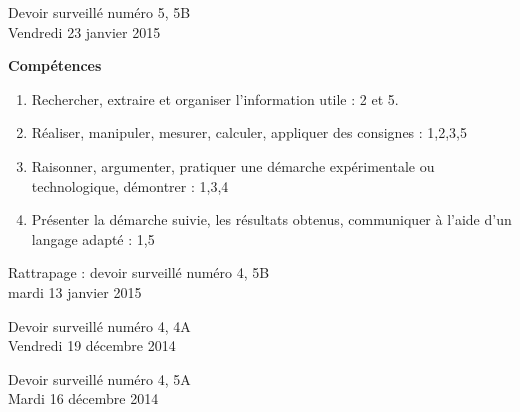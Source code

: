 \documentclass[a4paper,10pt]{article}
\begin{document}
\begin{feuilleDS}{Devoir surveillé numéro 5, 5B\\ \small Vendredi 23 janvier 2015}

\vspace{1cm}
{\bf Compétences}
\begin{enumerate}
    \item
        Rechercher, extraire et organiser l'information utile : 2 et 5.
    \item
Réaliser, manipuler, mesurer, calculer, appliquer des consignes : 1,2,3,5
\item
Raisonner, argumenter, pratiquer une démarche expérimentale ou technologique, démontrer : 1,3,4
\item 
Présenter la démarche suivie, les résultats obtenus, communiquer à l'aide d’un langage adapté : 1,5
\end{enumerate}

\end{feuilleDS}




\begin{feuilleDS}{Rattrapage : devoir surveillé numéro 4, 5B\\ \small mardi 13 janvier 2015}
\end{feuilleDS}


\begin{feuilleDS}{Devoir surveillé numéro 4, 4A\\ \small Vendredi 19 décembre 2014}

\end{feuilleDS}


\begin{feuilleDS}{Devoir surveillé numéro 4, 5A\\ \small Mardi 16 décembre 2014}
\end{feuilleDS}
\end{document}
